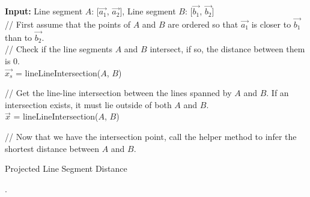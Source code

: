 \documentclass{kththesis}
\begin{document}
\begin{algorithm}[H]
\SetAlgoLined
{}
    \textbf{Input:} Line segment $A$: [$\vec{a_1}$, $\vec{a_2}$], Line segment $B$: [$\vec{b_1}$, $\vec{b_2}$]\\
    // First assume that the points of $A$ and $B$ are ordered so that $\vec{a_1}$ is closer to $\vec{b_1}$ than to $\vec{b_2}$.\\

    // Check if the line segments $A$ and $B$ intersect, if so, the distance between them is 0.\\
    $\vec{x_s}$ = lineLineIntersection($A$, $B$)\;
     {
    }

    // Get the line-line intersection between the lines spanned by $A$ and $B$. If an intersection exists, it must lie outside of both $A$ and $B$.\\
    $\vec{x}$ = lineLineIntersection($A$, $B$)\;


    // Now that we have the intersection point, call the helper method to infer the shortest distance between $A$ and $B$.\\
    \;

    \caption{Projected Line Segment Distance}
\end{algorithm}

.\\
\end{document}
